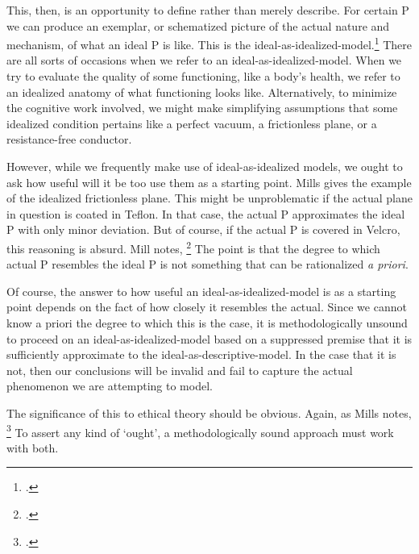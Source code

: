 \documentclass[letterpaper,notitlepage,12pt]{article}
\begin{document}
This, then, is an opportunity to define rather than merely describe.
For certain P we can produce an exemplar, or schematized picture of the actual
nature and mechanism, of what an ideal P is like.
This is the ideal-as-idealized-model.\footcite[p. 167]{mills_ideal_2005}
There are all sorts of occasions when we refer to an ideal-as-idealized-model.
When we try to evaluate the quality of some functioning, like a body's health,
we refer to an idealized anatomy of what  functioning looks
like.
Alternatively, to minimize the cognitive work involved, we might make
simplifying assumptions that some idealized condition pertains like a perfect
vacuum, a frictionless plane, or a resistance-free conductor.

However, while we frequently make use of ideal-as-idealized models, we ought to
ask how useful will it be too use them as a starting point.
Mills gives the example of the idealized frictionless plane.
This might be unproblematic if the actual plane in question is coated in Teflon.
In that case, the actual P approximates the ideal P with only minor deviation.
But of course, if the actual P is covered in Velcro, this reasoning is absurd.
Mill notes, \footcite[p. 167]{mills_ideal_2005}
The point is that the degree to which actual P resembles the ideal P is not
something that can be rationalized \textit{a priori}.

Of course, the answer to how useful an ideal-as-idealized-model is as a starting
point depends on the fact of how closely it resembles the actual.
Since we cannot know a priori the degree to which this is the case, it is
methodologically unsound to proceed on an ideal-as-idealized-model based on a
suppressed premise that it is sufficiently approximate to the
ideal-as-descriptive-model.
In the case that it is not, then our conclusions will be invalid and fail to
capture the actual phenomenon we are attempting to model.

The significance of this to ethical theory should be obvious.
Again, as Mills notes, \footcite[p. 167]{mills_ideal_2005}
To assert any kind of `ought', a methodologically sound approach must work with
both.
\end{document}
